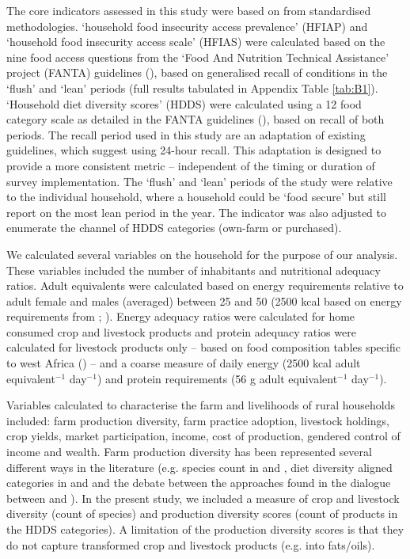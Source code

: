 The core indicators assessed in this study were based on from standardised methodologies. `household food insecurity access prevalence' (HFIAP) and `household food insecurity access scale' (HFIAS) were calculated based on the nine food access questions from the `Food And Nutrition Technical Assistance' project (FANTA) guidelines (\citealp{Coates2007}), based on generalised recall of conditions in the `flush' and `lean' periods (full results tabulated in Appendix Table \ref{tab:B1}). `Household diet diversity scores' (HDDS) were calculated using a 12 food category scale as detailed in the FANTA guidelines (\citealp{Swindale2006}), based on recall of both periods. The recall period used in this study are an adaptation of existing guidelines, which suggest using 24-hour recall. This adaptation is designed to provide a more consistent metric -- independent of the timing or duration of survey implementation. The `flush' and `lean' periods of the study were relative to the individual household, where a household could be `food secure' but still report on the most lean period in the year. The indicator was also adjusted to enumerate the channel of HDDS categories (own-farm or purchased).

We calculated several variables on the household for the purpose of our analysis. These variables included the number of inhabitants and nutritional adequacy ratios. Adult equivalents were calculated based on energy requirements relative to adult female and males (averaged) between 25 and 50 (2500 kcal based on energy requirements from \citealp{FoodandAgricuturalOrganization2001}; \citealp{ClaroRafael2010}). Energy adequacy ratios were calculated for home consumed crop and livestock products and protein adequacy ratios were calculated for livestock products only -- based on food composition tables specific to west Africa (\citealp{FAO2012}) -- and a coarse measure of daily energy (2500 kcal adult equivalent$^{-1}$ day$^{-1}$) and protein requirements (56 g adult equivalent$^{-1}$ day$^{-1}$).

Variables calculated to characterise the farm and livelihoods of rural households included: farm production diversity, farm practice adoption, livestock holdings, crop yields, market participation, income, cost of production, gendered control of income and wealth. Farm production diversity has been represented several different ways in the literature (e.g. species count in \citealp{Bellon2016} and \citealp{MKaibi2015}, diet diversity aligned categories in \citet{Koppmair2017325} and \citet{Jones2016} and the debate between the approaches found in the dialogue between \citealp{Berti2015} and \citealp{Sibhatu201510657}). In the present study, we included a measure of crop and livestock diversity (count of species) and production diversity scores (count of products in the HDDS categories). A limitation of the production diversity scores is that they do not capture transformed crop and livestock products (e.g. into fats/oils).

